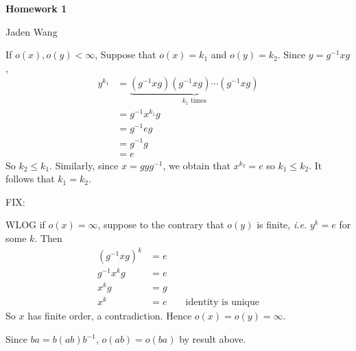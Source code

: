 \documentclass[12pt]{article}
\begin{document}
\centerline {\textsf{\textbf{\LARGE{Homework 1}}}}
\centerline {Jaden Wang}
\vspace{.15in}
\begin{problem}[1]
\begin{case}[1]
If $ o(x),o(y) < \infty$, 
Suppose that $ o(x) = k_1$ and $ o(y) = k_2$. Since $ y=g^{-1}xg$,
\begin{align*}
	y^{k_1} &= \underbrace{ (g^{-1}xg)(g^{-1}xg) \cdots (g^{-1}xg) }_{k_1 \text{ times}} \\ 
	&= g^{-1} x^{k_1} g \\
	&= g^{-1} e g \\
	&= g^{-1} g \\
	&= e 
\end{align*}
So $ k_2 \leq k_1$. Similarly, since $ x=gyg^{-1}$, we obtain that $ x^{k_2} = e$ so $ k_1 \leq k_2$. It follows that $ k_1 = k_2$.

\end{case}

FIX:
\begin{case}[2]
WLOG if $ o(x) = \infty$, suppose to the contrary that $ o(y)$ is finite,  \emph{i.e.} $ y^{k} =e$ for some $ k$. Then
\begin{align*}
	(g^{-1}xg)^{k} &= e \\
	g^{-1} x^{k} g &= e \\
	x^{k} g&= g \\
	x^{k} &= e && \text{ identity is unique} 
\end{align*}
So $ x$ has finite order, a contradiction. Hence  $ o(x)=o(y)= \infty$.
\end{case}
Since $ ba = b(ab)b ^{-1}$, $ o(ab) = o(ba)$ by result above.

\end{problem}
\end{document}
